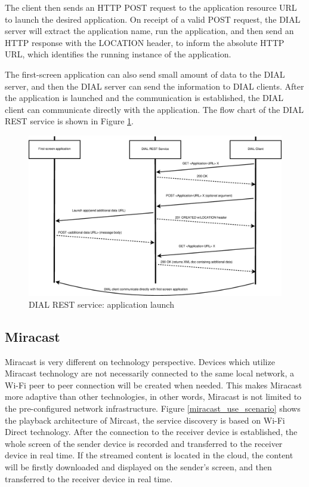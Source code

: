 The client then sends an HTTP POST request to the application resource URL to 
launch the desired application. On receipt of a valid POST request, the DIAL 
server will extract the application name, run the application, and then send 
an HTTP response with the LOCATION header, to inform the absolute HTTP URL, which 
identifies the running instance of the application.

The first-screen application can also send small amount of data to the DIAL 
server, and then the DIAL server can send the information to DIAL clients. 
After the application is launched and the communication is established, the DIAL 
client can communicate directly with the application. The flow chart of  the
DIAL REST service is  shown in Figure \ref{dial_rest}.
\begin{figure}[htb] \centering 
\includegraphics[width=1\columnwidth]{charts/dial_rest} 
\caption{DIAL REST service: application launch \label{dial_rest}} 
\end{figure} 
\clearpage
\subsection{Miracast\label{2_2_5}} %
Miracast \cite{miracast_industry} is very different on technology perspective.
Devices which utilize Miracast technology are not necessarily connected to
the same local network, a Wi-Fi peer to peer connection will be created when
needed. This makes Miracast more adaptive than other technologies, in other
words, Miracast is not limited to the pre-configured network infrastructure.
Figure \ref{miracast_use_scenario} shows the playback architecture of Mircast, the
service discovery is based on Wi-Fi Direct technology. After the connection to
the receiver device is established, the whole screen of the sender device is
recorded and transferred to the receiver device in real time. If the streamed
content is located in the cloud, the content will be firstly downloaded and
displayed on the sender's screen, and then transferred to the receiver device in
real time.

